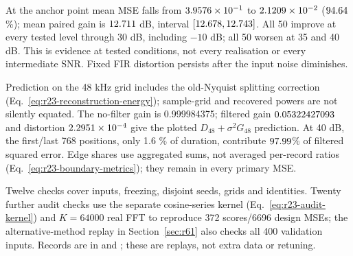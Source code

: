 \begin{samepage}
At the anchor point mean MSE falls from $3.9576\times10^{-1} $ to
$2.1209\times10^{-2} $ ($94.64 $\%); mean paired gain is
$12.711 $ dB, interval $[12.678,12.743]$.
All 50 improve at every tested level through 30 dB, including $-10 $ dB;
all 50 worsen at 35 and 40 dB. This is evidence at tested conditions,
not every realisation or every intermediate SNR. Fixed FIR distortion
persists after the input noise diminishes.
\end{samepage}

Prediction on the 48 kHz grid includes the old-Nyquist splitting correction
(Eq.~\eqref{eq:r23-reconstruction-energy}); sample-grid and recovered
powers are not silently equated. The no-filter gain is 0.999984375;
filtered gain $0.05322427093 $ and distortion $2.2951\times10^{-4} $ give
the plotted $ D_{48}+\sigma^2G_{48}$ prediction. At 40 dB, the first/last
768 positions, only 1.6 \% of duration, contribute
$97.99 $\% of filtered squared error. Edge shares use
aggregated sums, not averaged per-record ratios
(Eq.~\eqref{eq:r23-boundary-metrics}); they remain in every primary MSE.

Twelve checks cover inputs, freezing, disjoint seeds, grids and identities.
Twenty further audit checks use the separate cosine-series kernel
(Eq.~\eqref{eq:r23-audit-kernel}) and $K=64000$ real FFT to reproduce
372 scores/6696 design MSEs; the alternative-method replay in
Section~\ref{sec:r61} also checks all 400 validation inputs.
Records are in  and
; these are replays, not extra data or retuning.
